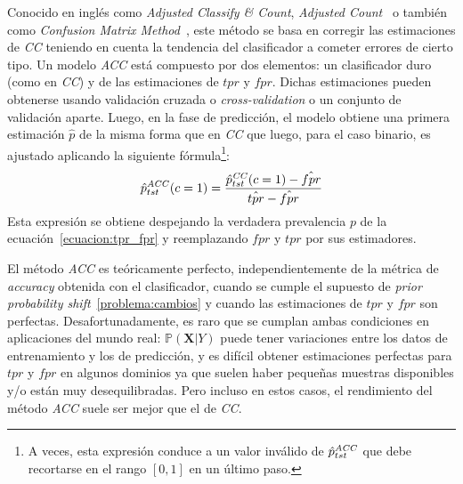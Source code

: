 Conocido en inglés como {\it Adjusted Classify \& Count}, {\it Adjusted
Count\/}~\cite{forman2008quantifying} o también como {\it Confusion Matrix
Method\/}~\cite{saerens2002adjusting}, este método se basa en corregir las
estimaciones de {\it CC\/} teniendo en cuenta la tendencia del clasificador a
cometer errores de cierto tipo. Un modelo {\it ACC\/} está compuesto por dos
elementos: un clasificador duro (como en {\it CC\/}) y de las estimaciones de
$tpr$ y $fpr$. Dichas estimaciones pueden obtenerse usando validación cruzada o
{\it cross-validation\/} o un conjunto de validación aparte. Luego, en la fase
de predicción, el modelo obtiene una primera estimación $\hat p$ de la misma
forma que en {\it CC\/} que luego, para el caso binario, es ajustado aplicando
la siguiente fórmula\footnote{A veces, esta expresión conduce a un valor
inválido de $\hat p^{\it ACC\/}_{tst}$ que debe recortarse en el rango $[0, 1]$
en un último paso.}:
\begin{equation}
    \hat p^{\it ACC\/}_{tst}(c=1) = \frac{\hat p^{\it CC\/}_{tst}(c=1)-\hat{fpr}}{\hat{tpr} - \hat{fpr}}\label{ecuacion:acc_binaria}
\end{equation}
Esta expresión se obtiene despejando la verdadera prevalencia $p$ de la
ecuación~\ref{ecuacion:tpr_fpr} y reemplazando $fpr$ y $tpr$ por sus
estimadores.

El método {\it ACC\/} es teóricamente perfecto, independientemente de la métrica
de {\it accuracy\/} obtenida con el clasificador, cuando se cumple el supuesto
de {\it prior probability shift\/}~\ref{problema:cambios} y cuando las
estimaciones de $tpr$ y $fpr$ son perfectas. Desafortunadamente, es raro que se
cumplan ambas condiciones en aplicaciones del mundo real:
$\mathbb{P}(\boldsymbol{X}|Y)$ puede tener variaciones entre los datos de
entrenamiento y los de predicción, y es difícil obtener estimaciones perfectas
para $tpr$ y $fpr$ en algunos dominios ya que suelen haber pequeñas muestras
disponibles y/o están muy desequilibradas. Pero incluso en estos casos, el
rendimiento del método {\it ACC\/} suele ser mejor que el de {\it CC}.

